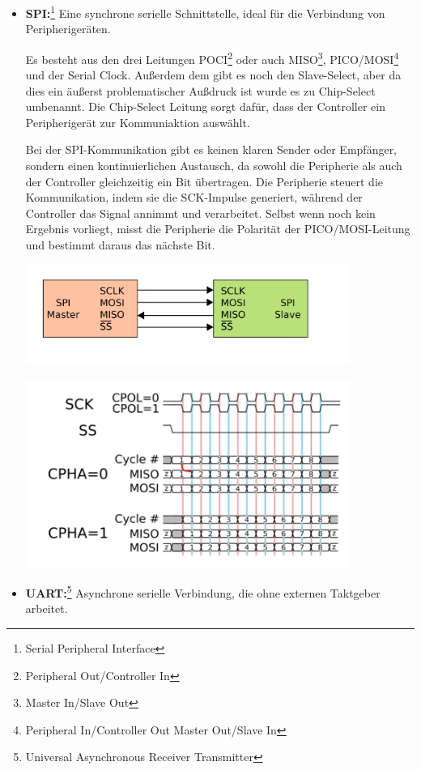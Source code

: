 \documentclass[
    headings=optiontotocandhead,%
    twoside,
    numbers=noenddot,%
    12pt, %
    titlepage, %
    parskip=full, %
    listof=leveldown, 
    numbers=noenddot, %
    a4paper,DIV=14,
    BCOR=15mm,
]{scrbook}
\let\origfigure=\figure
\let\endorigfigure=\endfigure
\renewenvironment{figure}[1][]{%
   \origfigure[H]
}{%
   \endorigfigure
}
\begin{document}
\begin{itemize}
\item
  \textbf{SPI:}\footnote{Serial Peripheral Interface} Eine synchrone
  serielle Schnittstelle, ideal für die Verbindung von Peripherigeräten.

  Es besteht aus den drei Leitungen POCI\footnote{Peripheral
    Out/Controller In} oder auch MISO\footnote{Master In/Slave Out},
  PICO/MOSI\footnote{Peripheral In/Controller Out \textbar{} Master
    Out/Slave In} und der Serial Clock. Außerdem dem gibt es noch den
  Slave-Select, aber da dies ein äußerst problematischer Außdruck ist
  wurde es zu Chip-Select umbenannt. Die Chip-Select Leitung sorgt
  dafür, dass der Controller ein Peripherigerät zur Kommuniaktion
  auswählt.

  Bei der SPI-Kommunikation gibt es keinen klaren Sender oder Empfänger,
  sondern einen kontinuierlichen Austausch, da sowohl die Peripherie als
  auch der Controller gleichzeitig ein Bit übertragen. Die Peripherie
  steuert die Kommunikation, indem sie die SCK-Impulse generiert,
  während der Controller das Signal annimmt und verarbeitet. Selbst wenn
  noch kein Ergebnis vorliegt, misst die Peripherie die Polarität der
  PICO/MOSI-Leitung und bestimmt daraus das nächste Bit.

  \begin{figure}
  \centering
  \includegraphics[width=4.16667in,height=\textheight]{img/Kampl/SPI-single-slave.svg.png}
  \caption{SPI-BUS-Grafik
  {[}\protect\hyperlink{ref-Serial-Peripheral-Interface-Grafik}{2}{]}}
  \end{figure}

  \begin{figure}
  \centering
  \includegraphics[width=4.16667in,height=\textheight]{img/Kampl/TimerDiagramm-SPI.png}
  \caption{SPI-Timerdiagramm
  {[}\protect\hyperlink{ref-Serielle-Schnittstellen}{3}{]}}
  \end{figure}
\item
  \textbf{UART:}\footnote{Universal Asynchronous Receiver Transmitter}
  Asynchrone serielle Verbindung, die ohne externen Taktgeber arbeitet.


\end{itemize}
\end{document}
